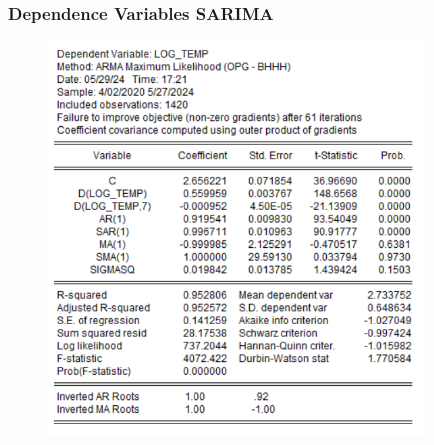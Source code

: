 \documentclass{article} %
\begin{document}
\subsubsection*{Dependence Variables SARIMA}

\begin{figure}[H]
\centering
\includegraphics[width=10cm]{images/Capture2.PNG}
\end{figure}
\end{document}

